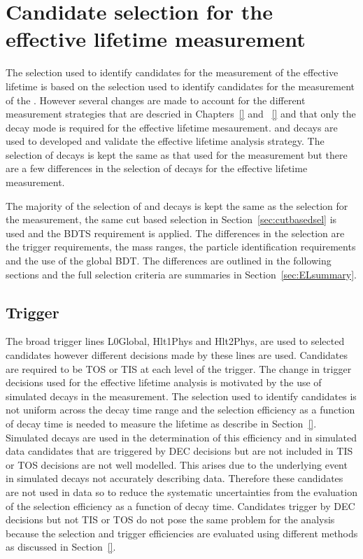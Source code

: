 \section{Candidate selection for the effective lifetime measurement}
\label{sec:ELsel}
The selection used to identify candidates for the measurement of the \bsmumu effective lifetime is based on the selection used to identify candidates for the measurement of the \bmumu \BFs. However several changes are made to account for the different measurement strategies that are descried in Chapters~\ref{} and ~\ref{} and that only the \bs decay mode is required for the effective lifetime mesaurement. 
\bhh and \bsjpsiphi decays are used to developed and validate the effective lifetime analysis strategy. The selection of \bsjpsiphi decays is kept the same as that used for the \BF measurement but there are a few differences in the selection of \bhh decays for the effective lifetime measurement.

The majority of the selection of \bsmumu and \bhh decays is kept the same as the selection for the \BF measurement, the same cut based selection in Section~\ref{sec:cutbasedsel} is used and the BDTS requirement is applied.   
The differences in the selection are the trigger requirements, the mass ranges, the particle identification requirements and the use of the global BDT. The differences are outlined in the following sections and the full selection criteria are summaries in Section~\ref{sec:ELsummary}.


\subsection{Trigger}
\label{sec:ELtrigger}

The broad trigger lines L0Global, Hlt1Phys and Hlt2Phys, are used to selected \bsmumu candidates however different decisions made by these lines are used. Candidates are required to be TOS or TIS at each level of the trigger. The change in trigger decisions used for the effective lifetime analysis is motivated by the use of simulated decays in the measurement. The selection used to identify candidates is not uniform across the decay time range and the selection efficiency as a function of decay time is needed to measure the lifetime as describe in Section~\ref{}. Simulated \bsmumu decays are used in the determination of this efficiency and in simulated data candidates that are triggered by DEC decisions but are not included in TIS or TOS decisions are not well modelled. This arises due to the underlying event in simulated decays not accurately describing data. Therefore these candidates are not used in data so to reduce the systematic uncertainties from the evaluation of the selection efficiency as a function of decay time. 
Candidates trigger by DEC decisions but not TIS or TOS do not pose the same problem for the \BF analysis because the selection and trigger efficiencies are evaluated using different methods as discussed in Section~\ref{}.

